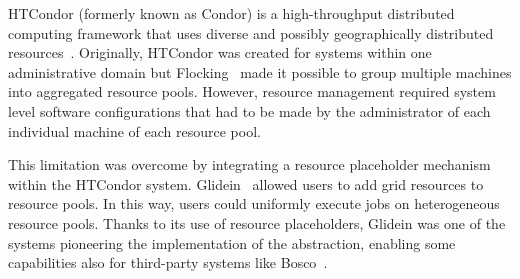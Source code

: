 \documentclass{sig-alternate}
\begin{document}


HTCondor (formerly known as Condor) is a high-throughput distributed computing
framework that uses diverse and possibly geographically distributed
resources~\cite{thain2005}. Originally, HTCondor was created for systems within
one administrative domain but Flocking~\cite{epema1996worldwide} made it
possible to group multiple machines into aggregated resource pools. However,
resource management required system level software configurations that had to be
made by the administrator of each individual machine of each resource pool.


This limitation was overcome by integrating a resource placeholder mechanism
within the HTCondor system. Gli\-de\-in~\cite{frey2002condorG} allowed users to
add grid resources to resource pools. In this way, users could uniformly execute
jobs on heterogeneous resource pools. Thanks to its use of resource
placeholders, Glidein was one of the systems pioneering the implementation of
the \pilot abstraction, enabling some \pilot capabilities also for third-party
systems like Bosco~\cite{weitzel2012campus}.

\end{document}
